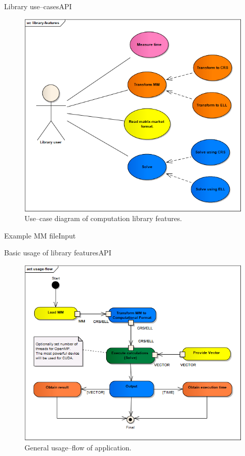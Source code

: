 		\begin{concerns}{Library use--cases}{API}
			\begin{figure}[!htp]
				\centering
				\includegraphics[scale=0.6]{others/img/library-features}
				\caption{Use--case diagram of computation library features.}
			\end{figure}
		\end{concerns}
		\clearpage
		\begin{concerns}{Example \gls{MM} file}{Input}
			
		\end{concerns}
		\clearpage
		\begin{concerns}{Basic usage of library features}{API}
			\begin{figure}[!htp]
				\centering
				\includegraphics[scale=0.6]{others/img/usage-flow}
				\caption{General usage--flow of application.}
			\end{figure}
		\end{concerns}
